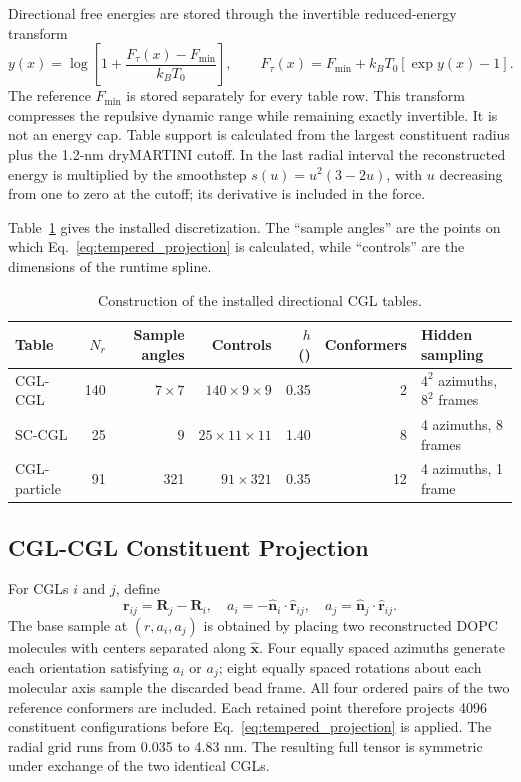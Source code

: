 \documentclass{article}
\newcommand{\angstrom}{\text{\normalfont\AA}}
\begin{document}
Directional free energies are stored through the invertible reduced-energy
transform
\begin{equation}
y(x)=\log\left[1+\frac{F_{\tau}(x)-F_{\min}}{k_BT_0}\right],
\qquad
F_{\tau}(x)=F_{\min}+k_BT_0[\exp y(x)-1].
\label{eq:table_transform}
\end{equation}
The reference $F_{\min}$ is stored separately for every table row.  This
transform compresses the repulsive dynamic range while remaining exactly
invertible.  It is not an energy cap.  Table support is calculated from the
largest constituent radius plus the 1.2-nm dryMARTINI cutoff.  In the last
radial interval the reconstructed energy is multiplied by the smoothstep
$s(u)=u^2(3-2u)$, with $u$ decreasing from one to zero at the cutoff; its
derivative is included in the force.

Table~\ref{tab:table_construction} gives the installed discretization.  The
``sample angles'' are the points on which Eq.~\ref{eq:tempered_projection} is
calculated, while ``controls'' are the dimensions of the runtime spline.

\begin{table}[ht]
\centering
\caption{Construction of the installed directional CGL tables.}
\small
\begin{tabular}{lrrrrrl}
\toprule
Table & $N_r$ & Sample angles & Controls & $h$ (\angstrom) & Conformers & Hidden sampling \\
\midrule
CGL-CGL & 140 & $7\times7$ & $140\times9\times9$ & 0.35 & 2
& $4^2$ azimuths, $8^2$ frames \\
SC-CGL & 25 & $9$ & $25\times11\times11$ & 1.40 & 8
& 4 azimuths, 8 frames \\
CGL-particle & 91 & 321 & $91\times321$ & 0.35 & 12
& 4 azimuths, 1 frame \\
\bottomrule
\end{tabular}
\label{tab:table_construction}
\end{table}

\subsection{CGL-CGL Constituent Projection}

For CGLs $i$ and $j$, define
\begin{equation}
\mathbf r_{ij}=\mathbf R_j-\mathbf R_i,\quad
a_i=-\hat{\mathbf n}_i\cdot\hat{\mathbf r}_{ij},\quad
a_j= \hat{\mathbf n}_j\cdot\hat{\mathbf r}_{ij}.
\label{eq:pair_coordinates}
\end{equation}
The base sample at $(r,a_i,a_j)$ is obtained by placing two reconstructed DOPC
molecules with centers separated along $\hat{\mathbf x}$.  Four equally spaced
azimuths generate each orientation satisfying $a_i$ or $a_j$; eight equally
spaced rotations about each molecular axis sample the discarded bead frame.
All four ordered pairs of the two reference conformers are included.  Each
retained point therefore projects 4096 constituent configurations before
Eq.~\ref{eq:tempered_projection} is applied.  The radial grid runs from 0.035
to 4.83 nm.  The resulting full tensor is symmetric under exchange of the two
identical CGLs.
\end{document}
